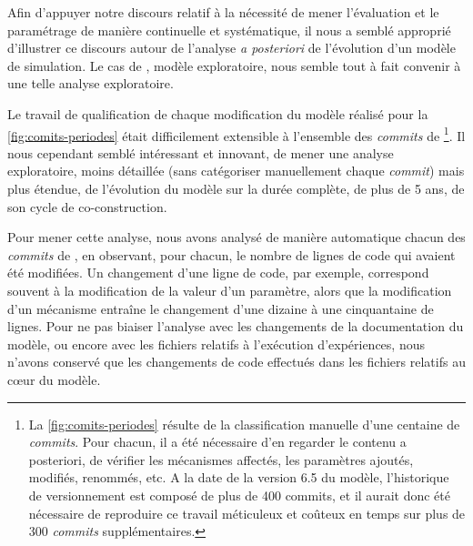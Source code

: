 Afin d'appuyer notre discours relatif à la nécessité de mener l'évaluation et le paramétrage de manière continuelle et systématique, il nous a semblé approprié d'illustrer ce discours autour de l'analyse \textit{a posteriori} de l'évolution d'un modèle de simulation.
Le cas de \simfeodal{}, modèle exploratoire, nous semble tout à fait convenir à une telle analyse exploratoire.

Le travail de qualification de chaque modification du modèle réalisé pour la \cref{fig:comits-periodes} était difficilement extensible à l'ensemble des \textit{commits} de \simfeodal{}\footnote{
	La \cref{fig:comits-periodes} résulte de la classification manuelle d'une centaine de \textit{commits}.
	Pour chacun, il a été nécessaire d'en regarder le contenu a posteriori, de vérifier les mécanismes affectés, les paramètres ajoutés, modifiés, renommés, etc.
	A la date de la version 6.5 du modèle, l'historique de versionnement est composé de plus de 400 commits, et il aurait donc été nécessaire de reproduire ce travail méticuleux et coûteux en temps sur plus de 300 \textit{commits} supplémentaires.
}.
Il nous cependant semblé intéressant et innovant, de mener une analyse exploratoire, moins détaillée (sans catégoriser manuellement chaque \textit{commit}) mais plus étendue, de l'évolution du modèle \simfeodal{} sur la durée complète, de plus de 5 ans, de son cycle de co-construction.

Pour mener cette analyse, nous avons analysé de manière automatique chacun des \textit{commits} de \simfeodal{}, en observant, pour chacun, le nombre de lignes de code qui avaient été modifiées.
Un changement d'une ligne de code, par exemple, correspond souvent à la modification de la valeur d'un paramètre, alors que la modification d'un mécanisme entraîne le changement d'une dizaine à une cinquantaine de lignes.
Pour ne pas biaiser l'analyse avec les changements de la documentation du modèle, ou encore avec les fichiers relatifs à l'exécution d'expériences, nous n'avons conservé que les changements de code effectués dans les fichiers relatifs au cœur du modèle.

